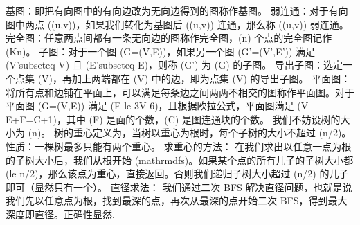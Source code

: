 \markdownRendererDocumentBegin
\markdownRendererSectionBegin
\markdownRendererSectionBegin
{}\markdownRendererInterblockSeparator
{}基图：即把有向图中的有向边改为无向边得到的图称作基图。\markdownRendererParagraphSeparator
{}弱连通：对于有向图中两点 ((u,v))，如果我们转化为基图后 ((u,v)) 连通，那么称 ((u,v)) 弱连通。\markdownRendererParagraphSeparator
{}完全图：任意两点间都有一条无向边的图称作完全图，(n) 个点的完全图记作 (K\markdownRendererUnderscore{}n)。\markdownRendererParagraphSeparator
{}子图：对于一个图 (G=(V,E))，如果另一个图 (G'=(V',E')) 满足 (V'\markdownRendererBackslash{}subseteq V) 且 (E'\markdownRendererBackslash{}subseteq E)，则称 (G') 为 (G) 的子图。\markdownRendererParagraphSeparator
{}导出子图：选定一个点集 (V)，再加上两端都在 (V) 中的边，即为点集 (V) 的导出子图。\markdownRendererParagraphSeparator
{}平面图：将所有点和边铺在平面上，可以满足每条边之间两两不相交的图称作平面图。对于平面图 (G=(V,E)) 满足 (E \markdownRendererBackslash{}le 3V-6)，且根据欧拉公式，平面图满足 (V-E+F=C+1)，其中 (F) 是面的个数，(C) 是图连通块的个数。\markdownRendererInterblockSeparator
{}
\markdownRendererSectionEnd \markdownRendererSectionBegin
{}\markdownRendererInterblockSeparator
{}\markdownRendererSectionBegin
{}\markdownRendererInterblockSeparator
{}我们不妨设树的大小为 (n)。\markdownRendererParagraphSeparator
{}树的重心定义为，当树以重心为根时，每个子树的大小不超过 (n/2)。\markdownRendererParagraphSeparator
{}性质：一棵树最多只能有两个重心。\markdownRendererParagraphSeparator
{}求重心的方法：\markdownRendererParagraphSeparator
{}在我们求出以任意一点为根的子树大小后，我们从根开始 (\markdownRendererBackslash{}mathrm\markdownRendererLeftBrace{}dfs\markdownRendererRightBrace{})。如果某个点的所有儿子的子树大小都 (\markdownRendererBackslash{}le n/2)，那么该点为重心，直接返回。否则我们递归子树大小超过 (n/2) 的儿子即可（显然只有一个）。\markdownRendererInterblockSeparator
{}\markdownRendererInterblockSeparator
{}
\markdownRendererSectionEnd \markdownRendererSectionBegin
{}\markdownRendererInterblockSeparator
{}直径求法：\markdownRendererParagraphSeparator
{}我们通过二次 \markdownRendererDollarSign{}BFS\markdownRendererDollarSign{} 解决直径问题，也就是说我们先以任意点为根，找到最深的点，再次从最深的点开始二次 \markdownRendererDollarSign{}BFS\markdownRendererDollarSign{}，得到最大深度即直径。正确性显然.\markdownRendererInterblockSeparator
